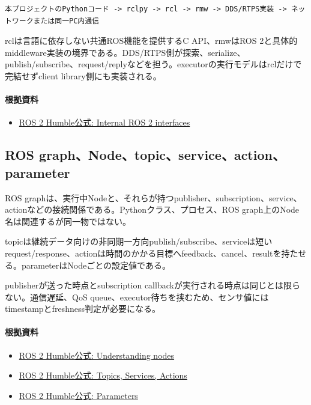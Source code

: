 \documentclass[a4paper,11pt]{article}
\begin{document}
\begin{lstlisting}
本プロジェクトのPythonコード -> rclpy -> rcl -> rmw -> DDS/RTPS実装 -> ネットワークまたは同一PC内通信
\end{lstlisting}


rclは言語に依存しない共通ROS機能を提供するC API、rmwはROS 2と具体的middleware実装の境界である。DDS/RTPS側が探索、serialize、publish/subscribe、request/replyなどを担う。executorの実行モデルはrclだけで完結せずclient library側にも実装される。

\paragraph{根拠資料}
\begin{itemize}[leftmargin=1.6em]
\item \href{https://docs.ros.org/en/humble/Concepts/About-Internal-Interfaces.html}{ROS 2 Humble公式: Internal ROS 2 interfaces}
\end{itemize}

\subsection{ROS graph、Node、topic、service、action、parameter}
ROS graphは、実行中Nodeと、それらが持つpublisher、subscription、service、actionなどの接続関係である。Pythonクラス、プロセス、ROS graph上のNode名は関連するが同一物ではない。


topicは継続データ向けの非同期一方向publish/subscribe、serviceは短いrequest/response、actionは時間のかかる目標へfeedback、cancel、resultを持たせる。parameterはNodeごとの設定値である。


publisherが送った時点とsubscription callbackが実行される時点は同じとは限らない。通信遅延、QoS queue、executor待ちを挟むため、センサ値にはtimestampとfreshness判定が必要になる。

\paragraph{根拠資料}
\begin{itemize}[leftmargin=1.6em]
\item \href{https://docs.ros.org/en/humble/Tutorials/Beginner-CLI-Tools/Understanding-ROS2-Nodes/Understanding-ROS2-Nodes.html}{ROS 2 Humble公式: Understanding nodes}
\item \href{https://docs.ros.org/en/humble/Concepts/Basic/Interfaces-Topics-Services-Actions.html}{ROS 2 Humble公式: Topics, Services, Actions}
\item \href{https://docs.ros.org/en/humble/Concepts/Basic/About-Parameters.html}{ROS 2 Humble公式: Parameters}
\end{itemize}
\end{document}
